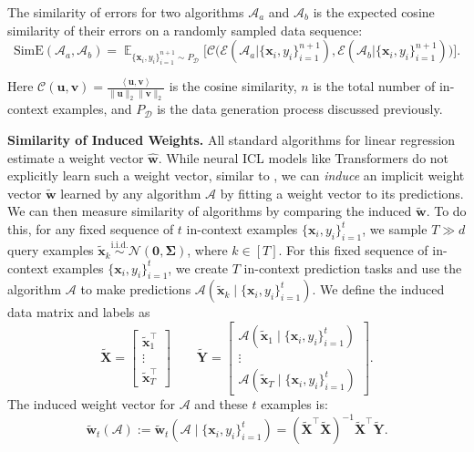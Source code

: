 \documentclass[11pt]{article}
\theoremstyle{plain}
\theoremstyle{definition}
\theoremstyle{remark}
\newcommand{\calA}{{\mathcal{A}}}
\newcommand{\calC}{{\mathcal{C}}}
\newcommand{\calE}{{\mathcal{E}}}
\newcommand{\zero}{\boldsymbol{0}}
\renewcommand{\^}[1]{^{(#1)}}
\newcommand{\bx}{\boldsymbol{x}}
\newcommand{\bX}{\boldsymbol{X}}
\newcommand{\bu}{\boldsymbol{u}}
\newcommand{\bY}{\boldsymbol{Y}}
\newcommand{\bw}{\boldsymbol{w}}
\newcommand{\bv}{\boldsymbol{v}}
\newcommand{\bSigma}{\boldsymbol{\Sigma}}
\newcommand{\inner}[1]{ \left\langle {#1} \right\rangle }
\newcommand{\iid}{\overset{\text{i.i.d.}}{\sim}}
\renewcommand{\paragraph}[1]{\vspace{1mm}\noindent\textbf{#1}}
\begin{document}
The similarity of errors for two algorithms $\calA_a$ and $\calA_b$ is the expected cosine similarity of their errors on a randomly sampled data sequence:
\begin{equation*}
    \mathrm{SimE}(\calA_a, \calA_b) 
    =   \mathop{\mathbb E}_{\{\bx_i, y_i\}_{i=1}^{n+1} \sim P_{\mathcal{D}}} \Bigg[
    \calC\Big(\calE(\calA_a | \{\bx_i, y_i\}_{i=1}^{n+1}), 
    \calE(\calA_b | \{\bx_i, y_i\}_{i=1}^{n+1})\Big)\Bigg]. 
\end{equation*}

Here $\calC(\bu, \bv) = \frac{
    \inner{\bu, \bv}
    }{\|\bu\|_2 \|\bv\|_2}$ is the cosine similarity, $n$ is the total number of in-context examples, and $P_{\mathcal{D}}$ is the data generation process discussed previously. 

\paragraph{Similarity of Induced Weights.}
All standard algorithms for linear regression estimate a weight vector $\hat{\bw}$. 
While neural ICL models like Transformers do not explicitly learn such a weight vector, similar to \citet{Akyrek2022WhatLA},
we can \emph{induce} an implicit weight vector $\tilde{\bw}$ learned by any algorithm $\calA$ by fitting a weight vector to its predictions.
We can then measure similarity of algorithms by comparing the induced $\tilde{\bw}$.
To do this, for any fixed sequence of $t$ in-context examples  $\{\bx_i, y_i\}_{i=1}^{t}$, we sample $T\gg d$ query examples  $\tilde{\bx}_{k} \iid \mathcal N(\zero, \bSigma)$, where $k\in [T]$. For this fixed sequence of in-context examples $\{\bx_i, y_i\}_{i=1}^{t}$, we create $T$ in-context prediction tasks and use the algorithm $\calA$ to make predictions $\calA(\tilde{\bx}_k \mid \{\bx_i, y_i\}_{i=1}^{t})$. We define the induced data matrix and labels as 
\begin{equation}
    \tilde{\bX} = \begin{bmatrix}
        \tilde{\bx}_1^\top \\  \vdots \\ \tilde{\bx}_T^\top
    \end{bmatrix}  \qquad \tilde{\bY} = \begin{bmatrix}
        \calA(\tilde{\bx}_1 \mid \{\bx_i, y_i\}_{i=1}^{t}) \\ 
        \vdots \\ 
        \calA(\tilde{\bx}_T \mid \{\bx_i, y_i\}_{i=1}^{t})
    \end{bmatrix}.
\end{equation}
The induced weight vector for $\calA$ and these $t$ examples is:
\begin{equation}
    \tilde{\bw}_t(\calA) := \tilde{\bw}_t(\calA \mid \{\bx_i, y_i\}_{i=1}^t) = (\tilde{\bX}^\top \tilde{\bX})^{-1} \tilde{\bX}^\top \tilde{\bY}.
\end{equation}
\end{document}
